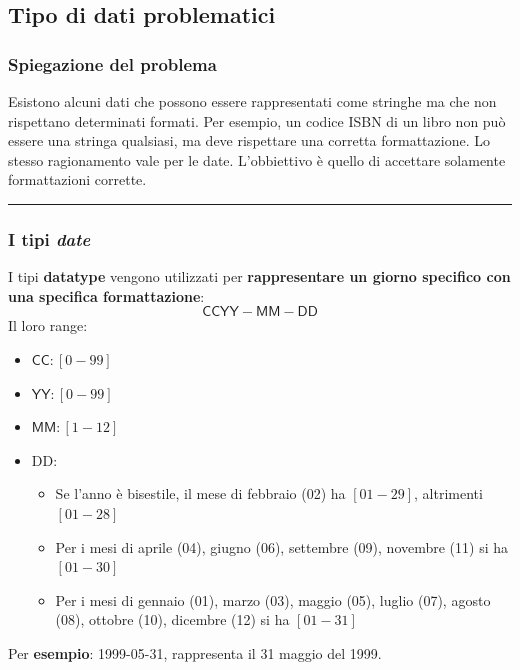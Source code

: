 \documentclass[a4paper]{article}
\newcommand{\longline}{\noindent\rule{\textwidth}{0.4pt}}
\begin{document}
	\newpage
	
	\subsection{Tipo di dati problematici}
	
	\subsubsection{Spiegazione del problema}
	
	Esistono alcuni dati che possono essere rappresentati come stringhe ma che non rispettano determinati formati. Per esempio, un codice ISBN di un libro non può essere una stringa qualsiasi, ma deve rispettare una corretta formattazione. Lo stesso ragionamento vale per le date. L'obbiettivo è quello di accettare solamente formattazioni corrette.
	
	\longline
	
	\subsubsection{I tipi \emph{date}}
	
	I tipi \textcolor{Red3}{\textbf{\textsf{datatype}}} vengono utilizzati per \textbf{rappresentare un giorno specifico con una specifica formattazione}:
	\begin{equation*}
		\textsf{CCYY}-\textsf{MM}-\textsf{DD}
	\end{equation*}
	Il loro range:
	\begin{itemize}
		\item $\textsf{CC}: \left[0 - 99\right]$
		
		\item $\textsf{YY}: \left[0 - 99\right]$
		
		\item $\textsf{MM}: \left[1 - 12\right]$
		
		\item \textsf{DD}:
		\begin{itemize}
			\item Se l'anno è bisestile, il mese di febbraio (02) ha $\left[01-29\right]$, altrimenti $\left[01-28\right]$
			
			\item Per i mesi di aprile (04), giugno (06), settembre (09), novembre (11) si ha $\left[01-30\right]$
			
			\item Per i mesi di gennaio (01), marzo (03), maggio (05), luglio (07), agosto (08), ottobre (10), dicembre (12) si ha $\left[01-31\right]$
		\end{itemize}
	\end{itemize}
	Per \textcolor{Green4}{\textbf{esempio}}: 1999-05-31, rappresenta il 31 maggio del 1999.\newline
	
\end{document}
